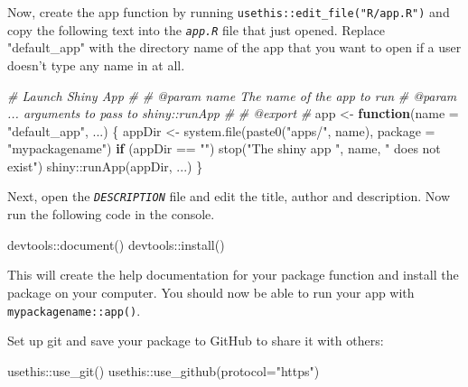 \documentclass[
  oneside]{book}
\newenvironment{Shaded}{\begin{snugshade}}{\end{snugshade}}
\newcommand{\AttributeTok}[1]{\textcolor[rgb]{0.77,0.63,0.00}{#1}}
\newcommand{\CommentTok}[1]{\textcolor[rgb]{0.56,0.35,0.01}{\textit{#1}}}
\newcommand{\ControlFlowTok}[1]{\textcolor[rgb]{0.13,0.29,0.53}{\textbf{#1}}}
\newcommand{\FunctionTok}[1]{\textcolor[rgb]{0.00,0.00,0.00}{#1}}
\newcommand{\NormalTok}[1]{#1}
\newcommand{\OtherTok}[1]{\textcolor[rgb]{0.56,0.35,0.01}{#1}}
\newcommand{\SpecialCharTok}[1]{\textcolor[rgb]{0.00,0.00,0.00}{#1}}
\newcommand{\StringTok}[1]{\textcolor[rgb]{0.31,0.60,0.02}{#1}}
\begin{document}
Now, create the app function by running \texttt{usethis::edit\_file("R/app.R")} and copy the following text into the \textit{\texttt{app.R}} file that just opened. Replace \StringTok{"default\_app"} with the directory name of the app that you want to open if a user doesn't type any name in at all.

\begin{Shaded}
\begin{Highlighting}[]
\CommentTok{\#\textquotesingle{} Launch Shiny App}
\CommentTok{\#\textquotesingle{}}
\CommentTok{\#\textquotesingle{} @param name The name of the app to run}
\CommentTok{\#\textquotesingle{} @param ... arguments to pass to shiny::runApp}
\CommentTok{\#\textquotesingle{}}
\CommentTok{\#\textquotesingle{} @export}
\CommentTok{\#\textquotesingle{}}
\NormalTok{app }\OtherTok{\textless{}{-}} \ControlFlowTok{function}\NormalTok{(}\AttributeTok{name =} \StringTok{"default\_app"}\NormalTok{, ...) \{}
\NormalTok{  appDir }\OtherTok{\textless{}{-}} \FunctionTok{system.file}\NormalTok{(}\FunctionTok{paste0}\NormalTok{(}\StringTok{"apps/"}\NormalTok{, name), }\AttributeTok{package =} \StringTok{"mypackagename"}\NormalTok{)}
  \ControlFlowTok{if}\NormalTok{ (appDir }\SpecialCharTok{==} \StringTok{""}\NormalTok{) }\FunctionTok{stop}\NormalTok{(}\StringTok{"The shiny app "}\NormalTok{, name, }\StringTok{" does not exist"}\NormalTok{)}
\NormalTok{  shiny}\SpecialCharTok{::}\FunctionTok{runApp}\NormalTok{(appDir, ...)}
\NormalTok{\}}
\end{Highlighting}
\end{Shaded}

Next, open the \textit{\texttt{DESCRIPTION}} file and edit the title, author and description. Now run the following code in the console.

\begin{Shaded}
\begin{Highlighting}[]
\NormalTok{devtools}\SpecialCharTok{::}\FunctionTok{document}\NormalTok{()}
\NormalTok{devtools}\SpecialCharTok{::}\FunctionTok{install}\NormalTok{()}
\end{Highlighting}
\end{Shaded}

This will create the help documentation for your package function and install the package on your computer. You should now be able to run your app with \texttt{mypackagename::app}\texttt{()}.

Set up git and save your package to GitHub to share it with others:

\begin{Shaded}
\begin{Highlighting}[]
\NormalTok{usethis}\SpecialCharTok{::}\FunctionTok{use\_git}\NormalTok{()}
\NormalTok{usethis}\SpecialCharTok{::}\FunctionTok{use\_github}\NormalTok{(}\AttributeTok{protocol=}\StringTok{"https"}\NormalTok{)}
\end{Highlighting}
\end{Shaded}
\end{document}

